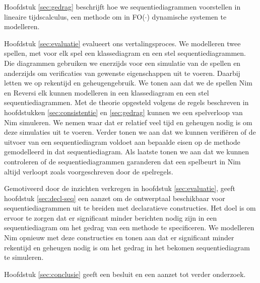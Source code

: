 \sloppy Hoofdstuk \ref{sec:gedrag} beschrijft hoe we sequentiediagrammen voorstellen in lineaire tijdscalculus\cite{BogaertsBart2014Sdsu}, een methode om in FO($\cdot$) dynamische systemen te modelleren.

Hoofdstuk \ref{sec:evaluatie} evalueert ons vertalingsproces. We modelleren twee spellen, met voor elk spel een klassediagram en een stel sequentiediagrammen. Die diagrammen gebruiken we enerzijds voor een simulatie van de spellen en anderzijds om verificaties van gewenste eigenschappen uit te voeren. Daarbij letten we op rekentijd en geheugengebruik. We tonen aan dat we de spellen Nim en Reversi elk kunnen modelleren in een klassediagram en een stel sequentiediagrammen. Met de theorie opgesteld volgens de regels beschreven in hoofdstukken \ref{sec:consistentie} en \ref{sec:gedrag} kunnen we een spelverloop van Nim simuleren. We nemen waar dat er relatief veel tijd en geheugen nodig is om deze simulaties uit te voeren. Verder tonen we aan dat we kunnen verifi\"eren of de uitvoer van een sequentiediagram voldoet aan bepaalde eisen op de methode gemodelleerd in dat sequentiediagram. Als laatste tonen we aan dat we kunnen controleren of de sequentiediagrammen garanderen dat een spelbeurt in Nim altijd verloopt zoals voorgeschreven door de spelregels.

Gemotiveerd door de inzichten verkregen in hoofdstuk \ref{sec:evaluatie}, geeft hoofdstuk \ref{sec:decl-seq} een aanzet om de ontwerptaal beschikbaar voor sequentiediagrammen uit te breiden met declaratieve constructies. Het doel is om ervoor te zorgen dat er significant minder berichten nodig zijn in een sequentiediagram om het gedrag van een methode te specificeren. We modelleren Nim opnieuw met deze constructies en tonen aan dat er significant minder rekentijd en geheugen nodig is om het gedrag in het bekomen sequentiediagram te simuleren.

Hoofdstuk \ref{sec:conclusie} geeft een besluit en een aanzet tot verder onderzoek.